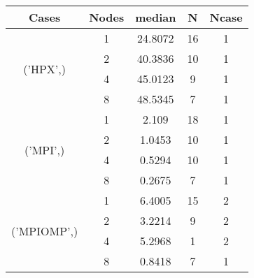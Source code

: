 \begin{tabular}{ccccc}
\hline
Cases & Nodes& median & N & Ncase \\
\hline
\multirow{4}{*}{('HPX',)}& 1& 24.8072& 16& 1\\
& 2& 40.3836& 10& 1\\
& 4& 45.0123& 9& 1\\
& 8& 48.5345& 7& 1\\
\hline
\multirow{4}{*}{('MPI',)}& 1& 2.109& 18& 1\\
& 2& 1.0453& 10& 1\\
& 4& 0.5294& 10& 1\\
& 8& 0.2675& 7& 1\\
\hline
\multirow{4}{*}{('MPIOMP',)}& 1& 6.4005& 15& 2\\
& 2& 3.2214& 9& 2\\
& 4& 5.2968& 1& 2\\
& 8& 0.8418& 7& 1\\
\hline
\end{tabular}



